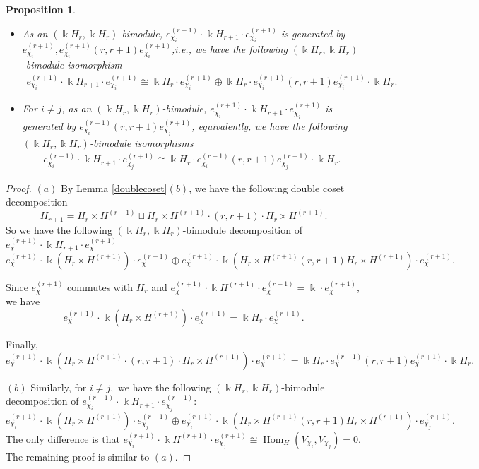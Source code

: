\documentclass[12pt]{amsart}
\numberwithin{itemcounter}{subsection}
\theoremstyle{plain}
\newtheorem{proposition}[theorem]{Proposition}
\theoremstyle{definition}
\theoremstyle{remark}
\numberwithin{equation}{section}
\def\k{\Bbbk}
\def\Hom{\operatorname{Hom}\nolimits}
\def\Hom{\operatorname{Hom}}
\begin{document}
\begin{proposition}\label{mkd}
\begin{itemize}
\item[$(a)$] As an $( \k H _r , \k H _r )$-bimodule, $ e^{(r+1)}_{\chi_i} \cdot  \k H _{r+1}
\cdot e^{(r+1)}_{\chi_i} $ is generated by $ e^{(r+1)}_{\chi_i} , e^{(r+1)}_{\chi_i}(r,r+1)e^{(r+1)}_{\chi_i} $,i.e., we have the following $( \k H _r , \k H _r )$-bimodule isomorphism
\begin{align*} e^{(r+1)}_{\chi_i}\cdot  \k H _{r+1} \cdot e^{(r+1)}_{\chi_i} \cong  \k H _r\cdot  e^{(r+1)}_{\chi_i}  \oplus  \k H _r  \cdot  e^{(r+1)}_{\chi_i}(r,r+1)e^{(r+1)}_{\chi_i}\cdot \k H _r.
\end{align*}
\item[$(b)$]For $i\neq j$, as an $( \k H _r , \k H _r )$-bimodule, $ e^{(r+1)}_{\chi_i} \cdot  \k H _{r+1}
\cdot e^{(r+1)}_{\chi_j} $ is generated by $ e^{(r+1)}_{\chi_i}(r,r+1)e^{(r+1)}_{\chi_j} $,
equivalently, we have the following $( \k H _r , \k H _r )$-bimodule isomorphisms
\begin{align*} e^{(r+1)}_{\chi_i}\cdot  \k H _{r+1} \cdot e^{(r+1)}_{\chi_j} \cong   \k H _r  \cdot  e^{(r+1)}_{\chi_i}(r,r+1)e^{(r+1)}_{\chi_j}\cdot \k H _r.\end{align*}
\end{itemize}
\end{proposition}
\begin{proof}

$(a)$ By Lemma \ref{doublecoset}$(b)$, we have the following double coset decomposition$$ H _{r+1}= H _{r}\times  H ^{(r+1)}\sqcup  H _{r}\times  H ^{(r+1)}\cdot (r,r+1)\cdot  H _{r}\times  H ^{(r+1)}.$$
So we have the following $(\k H _r,\k H _r)$-bimodule decomposition  of $e^{(r+1)}_{\chi}\cdot   \k H _{r+1} \cdot  e^{(r+1)}_{\chi}$
$$e^{(r+1)}_{\chi}\cdot \k(H_r\times H^{(r+1)}) \cdot e^{(r+1)}_{\chi} \oplus  e^{(r+1)}_{\chi}\cdot \k( H_r\times H^{(r+1)}(r,r+1)H_r\times H^{(r+1)})\cdot  e^{(r+1)}_{\chi} .$$

Since $ e^{(r+1)}_{\chi} $ commutes with $ H _r$ and $e^{(r+1)}_{\chi} \cdot \k H ^{(r+1)}\cdot  e^{(r+1)}_{\chi}=\k\cdot e^{(r+1)}_{\chi}$, we have $$ e^{(r+1)}_{\chi} \cdot \k(H_r\times H^{(r+1)})\cdot e^{(r+1)}_{\chi} = \k H _r \cdot  e^{(r+1)}_{\chi}.$$

Finally,  $$ e^{(r+1)}_{\chi}\cdot \k( H_r\times H^{(r+1)}\cdot(r,r+1)\cdot H_r\times H^{(r+1)})\cdot  e^{(r+1)}_{\chi} = \k H _r  \cdot e^{(r+1)}_{\chi} (r,r+1)
e^{(r+1)}_{\chi} \cdot  \k H _r . $$
\smallskip

$(b)$ Similarly, for $i\neq j,$  we have the following $(\k H _r,\k H _r)$-bimodule decomposition  of $e^{(r+1)}_{\chi_i}\cdot   \k H _{r+1} \cdot  e^{(r+1)}_{\chi_j}$:
$$e^{(r+1)}_{\chi_i}\cdot  \k( H _{r}\times  H ^{(r+1)}) \cdot e^{(r+1)}_{\chi_j} \oplus  e^{(r+1)}_{\chi_i}\cdot  \k( H _{r}\times  H ^{(r+1)}(r,r+1) H _{r}\times  H ^{(r+1)})\cdot  e^{(r+1)}_{\chi_j} .$$
The only difference is that $e^{(r+1)}_{\chi_i} \cdot \k H ^{(r+1)}\cdot  e^{(r+1)}_{\chi_j}\cong\Hom_{ H }(V_{\chi_i},V_{\chi_j})=0.$
The remaining proof is similar to $(a).$
\end{proof}
\end{document}
